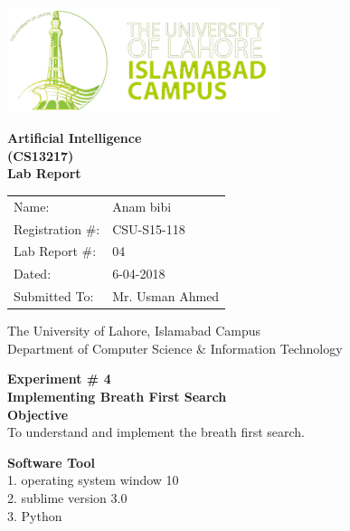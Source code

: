 \documentclass[11pt]{article}            %
\begin{document}
\begin{titlepage}
    \centering
  \vfill
    \includegraphics[width=8cm]{uni_logo.png} \\ 
	\vskip2cm
    {\bfseries\Large
	Artificial Intelligence \\ (CS13217)\\
	
	\vskip2cm
	Lab Report 
	 
	\vskip2cm
	}    

\begin{center}
\begin{tabular}{ l l  } 

Name: & Anam bibi \\ 
Registration \#: & CSU-S15-118\\ 
Lab Report \#: & 04 \\ 
 Dated:& 6-04-2018\\ 
Submitted To:& Mr. Usman Ahmed\\ 

\end{tabular}
\end{center}
    \vfill
    The University of Lahore, Islamabad Campus\\
Department of Computer Science \& Information Technology
\end{titlepage}


    
    {\bfseries\Large
\centering
	Experiment \# 4 \\

Implementing Breath First Search\\
	
	}    
 \vskip1cm
 \textbf {Objective}\\  To understand and implement the breath first search.
 
 \textbf {Software Tool} \\
1. operating system window 10 \\
2. sublime version 3.0\\
3. Python\\
\end{document}
